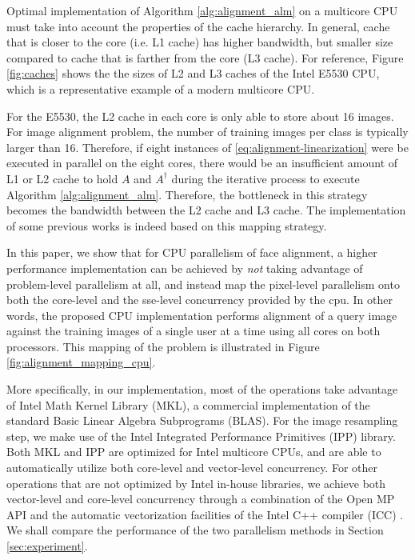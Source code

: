 \documentclass[10pt,twocolumn,letterpaper]{article}
\begin{document}
Optimal implementation of Algorithm \ref{alg:alignment_alm} on a multicore CPU must take 
into account the properties of the cache hierarchy. In general, cache that is 
closer to the core (i.e. L1 cache) has higher bandwidth, but smaller size compared to cache
that is farther from the core (L3 cache).  For reference, Figure \ref{fig:caches} 
shows the the sizes of L2 and L3 caches of the Intel E5530 CPU, 
which is a representative example of a modern multicore CPU. 

For the E5530, the L2 cache in each core is only able to store about 16 images.
For image alignment problem, the number of training images per class is
typically larger than 16.  Therefore, if eight instances of
\eqref{eq:alignment-linearization} were be executed in parallel on the eight
cores, there would be an insufficient amount of L1 or L2 cache to hold $A$ and
$A^\dagger$ during the iterative process to execute Algorithm
\ref{alg:alignment_alm}. Therefore, the bottleneck in this strategy becomes the
bandwidth between the L2 cache and L3 cache. The implementation of some
previous works \cite{WagnerA2009-CVPR,WagnerA2011-PAMI} is indeed based on this
mapping strategy.

In this paper, we show that for CPU parallelism of face alignment, a higher
performance implementation can be achieved by {\em not} taking advantage of
problem-level parallelism at all, and instead map the pixel-level parallelism
onto both the core-level and the sse-level concurrency provided by the cpu.  In
other words, the proposed CPU implementation performs alignment of a query
image against the training images of a single user at a time using all cores on
both processors.
This mapping of the problem is illustrated in Figure \ref{fig:alignment_mapping_cpu}.

More specifically, in our implementation, most of the operations take
advantage of Intel Math Kernel Library (MKL), a commercial implementation of
the standard Basic Linear Algebra Subprograms (BLAS). For the image resampling
step, we make use of the Intel Integrated Performance Primitives (IPP) library.
Both MKL and IPP are optimized for Intel multicore CPUs, and are able to
automatically utilize both core-level and vector-level concurrency. For other
operations that are not optimized by Intel in-house libraries, we achieve both
vector-level and core-level concurrency through a combination of the Open MP
API \cite{dagum2002openmp} and the automatic vectorization facilities of the
Intel C++ compiler (ICC) \cite{dulong1999overview}. We shall compare the
performance of the two parallelism methods in Section \ref{sec:experiment}.
\end{document}
